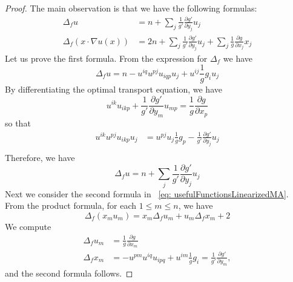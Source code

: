 \documentclass[12pt,reqno]{amsart}
\newcommand{\del}{\partial}
\numberwithin{equation}{section}
\begin{document}
\begin{proof}
The main observation is that we have the following formulas:
\begin{equation}\label{eq: usefulFunctionsLinearizedMA}
\begin{aligned}
    \Delta_f u &=n+\sum_j\frac{1}{g'}\frac{\del g'}{\del y_j}u_j\\
    \Delta_f\left(x\cdot \nabla u(x) \right)&= 2n+\sum_j\frac{1}{g'}\frac{\del g'}{\del y_j}u_j+\sum_j\frac{1}{g}\frac{\del g}{\del x_j}x_j
\end{aligned}
\end{equation}
Let us prove the first formula.  From the expression for $\Delta_{f}$ we have
\[
\Delta_fu = n-u^{iq}u^{pj}u_{iqp}u_j + u^{ij}\frac{1}{g}g_iu_j
\]
By differentiating the optimal transport equation, we have
\[
u^{ik}u_{ikp} + \frac{1}{g'}\frac{\del g'}{\del y_m}u_{mp} =\frac{1}{g}\frac{\del g}{\del x_p}
\]
so that
\[
\begin{aligned}
u^{ik}u^{pj}u_{ikp}u_j&= u^{pj}u_j\frac{1}{g} g_p- \frac{1}{g'}\frac{\del g'}{\del y_j}u_j\\
\end{aligned}
\]
Therefore, we have
\[
\Delta_fu = n+ \sum_j\frac{1}{g'}\frac{\del g'}{\del y_j}u_j
\]
Next we consider the second formula in ~\eqref{eq: usefulFunctionsLinearizedMA}.  From the product formula, for each $1 \leq m \leq n$, we have
\[
\Delta_f (x_mu_m) = x_m\Delta_f u_m + u_m\Delta_f x_m + 2
\]
We compute
\[
\begin{aligned}
\Delta_fu_m &= \frac{1}{g}\frac{\del g}{\del x_m}\\
\Delta_f x_m &= -u^{pm}u^{iq}u_{ipq} + u^{im}\frac{1}{g}g_i = \frac{1}{g'}\frac{\del g'}{\del y_m},
\end{aligned}
\]
and the second formula follows.


\end{proof}
\end{document}
